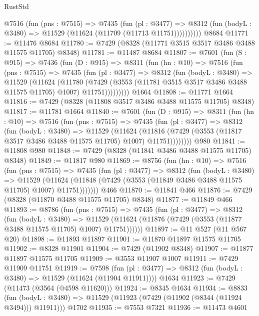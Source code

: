 \begin{lexlean}{RustStd}
\begin{coremodule}
          @7516
            (fun (pns : @7515) =>
            @7435
              (fun (pl : @3477) =>
              @8312 (fun (bodyL : @3480) => @11529 (@11624 (@11709 (@11713 @11751))))))))))
    @8684
@11771 := @11476 @8684
@11780 := @7429 (@8328 (@11771 @3515 @3517 @3486 @3488 @11575 @11705) @8348)
@11781 := @11487 @8684
@11807 := @7601
    (fun (S : @915) =>
    @7436
      (fun (D : @915) =>
      @8311
        (fun (hn : @10) =>
        @7516
          (fun (pns : @7515) =>
          @7435
            (fun (pl : @3477) =>
            @8312
              (fun (bodyL : @3480) =>
              @11529
                (@11624
                  (@11780
                    (@7429
                      (@3553 (@11781 @3515 @3517 @3486 @3488 @11575 @11705) @1007)
                      @11751)))))))))
    @1664
@11808 := @11771 @1664
@11816 := @7429 (@8328 (@11808 @3517 @3486 @3488 @11575 @11705) @8348)
@11817 := @11781 @1664
@11840 := @7601
    (fun (D : @915) =>
    @8311
      (fun (hn : @10) =>
      @7516
        (fun (pns : @7515) =>
        @7435
          (fun (pl : @3477) =>
          @8312
            (fun (bodyL : @3480) =>
            @11529
              (@11624
                (@11816 (@7429 (@3553 (@11817 @3517 @3486 @3488 @11575 @11705) @1007) @11751))))))))
    @980
@11841 := @11808 @980
@11848 := @7429 (@8328 (@11841 @3486 @3488 @11575 @11705) @8348)
@11849 := @11817 @980
@11869 := @8756
    (fun (hn : @10) =>
    @7516
      (fun (pns : @7515) =>
      @7435
        (fun (pl : @3477) =>
        @8312
          (fun (bodyL : @3480) =>
          @11529
            (@11624 (@11848 (@7429 (@3553 (@11849 @3486 @3488 @11575 @11705) @1007) @11751)))))))
    @466
@11870 := @11841 @466
@11876 := @7429 (@8328 (@11870 @3488 @11575 @11705) @8348)
@11877 := @11849 @466
@11893 := @8786
    (fun (pns : @7515) =>
    @7435
      (fun (pl : @3477) =>
      @8312
        (fun (bodyL : @3480) =>
        @11529 (@11624 (@11876 (@7429 (@3553 (@11877 @3488 @11575 @11705) @1007) @11751))))))
@11897 := @11 @527 (@11 @567 @20)
@11898 := @11893 @11897
@11901 := @11870 @11897 @11575 @11705
@11902 := @8328 @11901
@11904 := @7429 (@11902 @8348)
@11907 := @11877 @11897 @11575 @11705
@11909 := @3553 @11907 @1007
@11911 := @7429 @11909 @11751
@11919 := @7598
    (fun (pl : @3477) => @8312 (fun (bodyL : @3480) => @11529 (@11624 (@11904 @11911))))
    @1634
@11923 := @7429 (@11473 (@3564 (@4598 @11620)))
@11924 := @8345 @1634
@11934 := @8833
    (fun (bodyL : @3480) => @11529 (@11923 (@7429 (@11902 (@8344 (@11924 @3494))) @11911)))
    @1702
@11935 := @7553 @7321
@11936 := @11473 @4601

\end{coremodule}
\end{lexlean}
